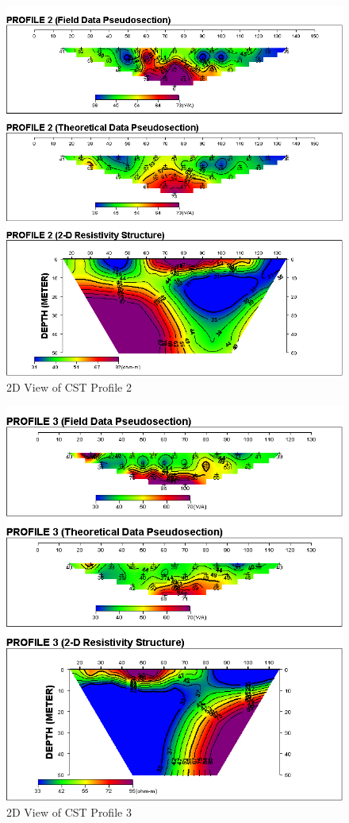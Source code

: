 \documentclass[12pt,a4paper]{report}
\begin{document}
\begin{figure}[H]
    \centering
    \includegraphics[width=1.0\textwidth]{PROFILE 2D.png}
    \caption{2D View of CST Profile 2}
    \label{fig:UI_CST_2_Curve}
\end{figure}

\begin{figure}[H]
    \centering
    \includegraphics[width=1.0\textwidth]{PROFILE 3D.png}
    \caption{2D View of CST Profile 3}
    \label{fig:UI_CST_3_Curve}
\end{figure}
\end{document}
